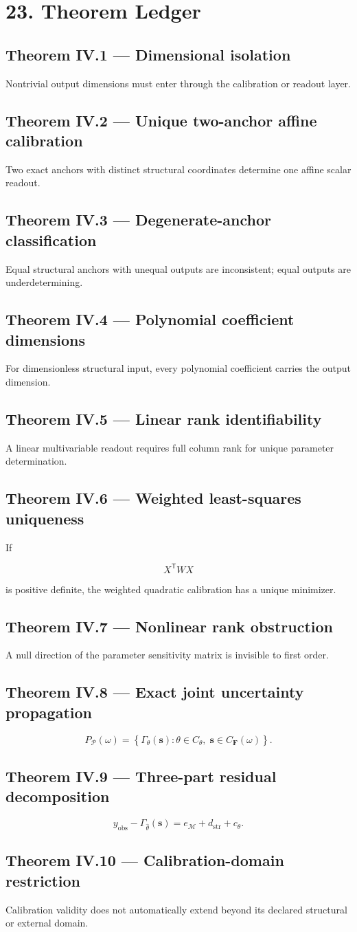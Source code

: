 \documentclass[11pt,oneside,openany]{book}
\newcommand{\PCsection}[1]{%
  \section*{#1}\addcontentsline{toc}{section}{#1}%
}
\newcommand{\PCsubsection}[1]{%
  \subsection*{#1}%
}
\begin{document}
\PCsection{23. Theorem Ledger}

\PCsubsection{Theorem IV.1 --- Dimensional isolation}

Nontrivial output dimensions must enter through the calibration or readout layer.

\PCsubsection{Theorem IV.2 --- Unique two-anchor affine calibration}

Two exact anchors with distinct structural coordinates determine one affine scalar readout.

\PCsubsection{Theorem IV.3 --- Degenerate-anchor classification}

Equal structural anchors with unequal outputs are inconsistent; equal outputs are underdetermining.

\PCsubsection{Theorem IV.4 --- Polynomial coefficient dimensions}

For dimensionless structural input, every polynomial coefficient carries the output dimension.

\PCsubsection{Theorem IV.5 --- Linear rank identifiability}

A linear multivariable readout requires full column rank for unique parameter determination.

\PCsubsection{Theorem IV.6 --- Weighted least-squares uniqueness}

If

\[
X^{\mathsf T}WX
\]

is positive definite, the weighted quadratic calibration has a unique minimizer.

\PCsubsection{Theorem IV.7 --- Nonlinear rank obstruction}

A null direction of the parameter sensitivity matrix is invisible to first order.

\PCsubsection{Theorem IV.8 --- Exact joint uncertainty propagation}

\[
P_{\mathcal P}(\omega) = \left\{ \Gamma_\theta(\mathbf s): \theta\in C_\theta,\; \mathbf s\in C_{\mathbf F}(\omega) \right\}.
\]

\PCsubsection{Theorem IV.9 --- Three-part residual decomposition}

\[
y_{\mathrm{obs}} - \Gamma_{\widehat\theta}(\mathbf s) = e_{\mathcal M} + d_{\mathrm{str}} + c_\theta.
\]

\PCsubsection{Theorem IV.10 --- Calibration-domain restriction}

Calibration validity does not automatically extend beyond its declared structural or external domain.
\end{document}
